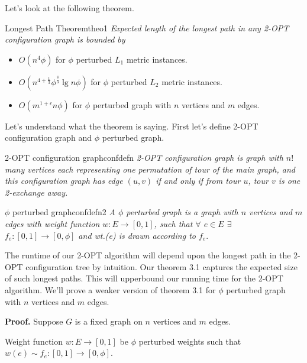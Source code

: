 \documentclass[12pt, a4paper]{article}
\begin{document}
\noindent Let's look at the following theorem.

\begin{theo}{Longest Path Theorem}{theo1}
    \textit{Expected length of the longest path in any 2-{\sf OPT} configuration graph is bounded by}

    \begin{itemize}
        \item $O(n^4 \phi)$ for $\phi$ perturbed $L_1$ metric instances.
        \item $O(n^{4 + \frac{1}{3}} \phi^{\frac{8}{3}} \lg n \phi)$ for $\phi$ perturbed $L_2$ metric instances.
        \item $O(m^{1 + \epsilon} n \phi)$ for $\phi$ perturbed graph with $n$ vertices and $m$ edges.
    \end{itemize}
\end{theo}

\noindent Let's understand what the theorem is saying. First let's define 2-{\sf OPT} configuration graph and $\phi$ perturbed graph.

\begin{define}{2-{\sf OPT} configuration graph}{confdefn}
    \textit{2-{\sf OPT} configuration graph is graph with $n!$ many vertices each representing one permutation of tour of the main graph, and this configuration graph has edge $(u, v)$ if and only if from tour $u$, tour $v$ is one 2-exchange away.}
\end{define}

\begin{define}{$\phi$ perturbed graph}{confdefn2}
    \textit{A $\phi$ perturbed graph is a graph with $n$ vertices and $m$ edges with weight function $w:E \to [0,1]$, such that $\forall$ $e \in E$ $\exists$ $f_e:[0,1] \to [0, \phi]$ and wt.(e) is drawn according to $f_e$}.
\end{define}

\noindent The runtime of our 2-{\sf OPT} algorithm will depend upon the longest path in the 2-{\sf OPT} configuration tree by intuition. Our theorem 3.1 captures the expected size of such longest paths. This will upperbound our running time for the 2-{\sf OPT} algorithm. We'll prove a weaker version of theorem 3.1 for $\phi$ perturbed graph with $n$ vertices and $m$ edges.

\bigskip

\noindent \textbf{Proof.} Suppose $G$ is a fixed graph on $n$ vertices and $m$ edges.

\noindent Weight function $w:E \to [0,1]$ be $\phi$ perturbed weights such that $w(e) \sim f_e:[0,1] \to [0, \phi]$.
\end{document}
